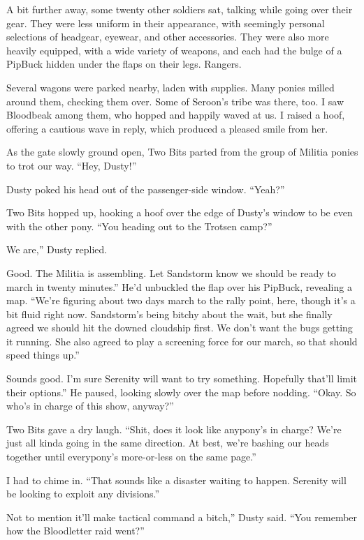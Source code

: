 A bit further away, some twenty other soldiers sat, talking while going over their gear. They were less uniform in their appearance, with seemingly personal selections of headgear, eyewear, and other accessories. They were also more heavily equipped, with a wide variety of weapons, and each had the bulge of a PipBuck hidden under the flaps on their legs. Rangers.

Several wagons were parked nearby, laden with supplies. Many ponies milled around them, checking them over. Some of Seroon’s tribe was there, too. I saw Bloodbeak among them, who hopped and happily waved at us. I raised a hoof, offering a cautious wave in reply, which produced a pleased smile from her.

As the gate slowly ground open, Two Bits parted from the group of Militia ponies to trot our way. “Hey, Dusty!”

Dusty poked his head out of the passenger-side window. “Yeah?”

Two Bits hopped up, hooking a hoof over the edge of Dusty’s window to be even with the other pony. “You heading out to the Trotsen camp?”

\leavevmode{}We are,” Dusty replied.

\leavevmode{}Good. The Militia is assembling. Let Sandstorm know we should be ready to march in twenty minutes.” He’d unbuckled the flap over his PipBuck, revealing a map. “We’re figuring about two days march to the rally point, here, though it’s a bit fluid right now. Sandstorm’s being bitchy about the wait, but she finally agreed we should hit the downed cloudship first. We don’t want the bugs getting it running. She also agreed to play a screening force for our march, so that should speed things up.”

\leavevmode{}Sounds good. I’m sure Serenity will want to try something. Hopefully that’ll limit their options.” He paused, looking slowly over the map before nodding. “Okay. So who’s in charge of this show, anyway?”

Two Bits gave a dry laugh. “Shit, does it look like anypony’s in charge? We’re just all kinda going in the same direction. At best, we’re bashing our heads together until everypony’s more-or-less on the same page.”

I had to chime in. “That sounds like a disaster waiting to happen. Serenity will be looking to exploit any divisions.”

\leavevmode{}Not to mention it’ll make tactical command a bitch,” Dusty said. “You remember how the Bloodletter raid went?”

